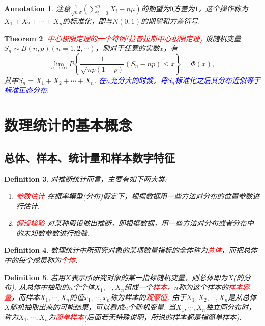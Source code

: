 \documentclass{article}
\newtheorem{theorem}{Theorem}[section]
\newtheorem{definition}[theorem]{Definition}
\newtheorem{annotation}[theorem]{Annotation}
\newcommand{\redt}[1]{\textcolor{red}{#1}}
\newcommand{\bluet}[1]{\textcolor{blue}{#1}}
\begin{document}
\begin{annotation}
\rm 注意$\frac{1}{\sqrt{n}\sigma}(\sum\limits_{i=0}^nX_i - n\mu)$的期望为$0$方差为$1$，这个操作称为$X_1 + X_2 +\cdots + X_n$的标准化，即与$N(0,1)$的期望和方差符号. 
\end{annotation}

\begin{theorem}
\rm \redt{中心极限定理的一个特例(拉普拉斯中心极限定理)} 设随机变量$S_n \sim B(n,p)(n=1,2,\cdots)$，则对于任意的实数$x$，有
$$
\lim\limits_{n \rightarrow \infty}P\left\{\frac{1}{\sqrt{np(1-p)}}(S_n - np) \leq x\right\} = \Phi(x),
$$
其中$S_n = X_1+X_2+\cdots + X_n$. \bluet{在$n$充分大的时候，将$S_n$标准化之后其分布近似等于标准正态分布}. 
\end{theorem}


\newpage
\section{数理统计的基本概念}

\subsection{总体、样本、统计量和样本数字特征}

\begin{definition}
\rm 对推断统计而言，主要有如下两大类:
\begin{enumerate}
	\item \redt{参数估计} 在概率模型(分布)假定下，根据数据用一些方法对分布的位置参数进行估计. 
	\item \redt{假设检验} 对某种假设做出推断，即根据数据，用一些方法对分布或者分布中的未知数参数进行检验. 
\end{enumerate}
\end{definition}

\begin{definition}
\rm 数理统计中所研究对象的某项数量指标的全体称为\redt{总体}，而把总体中的每个成员称为\redt{个体}.
\end{definition}

\begin{definition}
\rm 若用$X$表示所研究对象的某一指标随机变量，则总体即为$X$(的分布). 从总体中抽取的$n$个个体$X_1,\cdots,X_n$组成一个\redt{样本}，$n$称为这个样本的\redt{样本容量}，而样本$X_1,\cdots,X_n$的值$x_1,\cdots,x_n$称为样本的\redt{观察值}. 由于$X_1,X_2,\cdots,X_n$是从总体$X$随机抽取出来的可能结果，可以看成$n$个随机变量. 当$X_1,\cdots,X_n$独立同分布时，称为$X_1,\cdots,X_n$为\redt{简单样本}(后面若无特殊说明，所说的样本都是指简单样本).
\end{definition}
\end{document}
